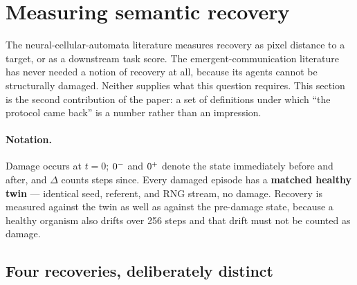 \section{Measuring semantic recovery}
\label{sec:protocol}

The neural-cellular-automata literature measures recovery as pixel distance to a
target, or as a downstream task score. The emergent-communication literature has
never needed a notion of recovery at all, because its agents cannot be
structurally damaged. Neither supplies what this question requires. This section
is the second contribution of the paper: a set of definitions under which
``the protocol came back'' is a number rather than an impression.

\paragraph{Notation.} Damage occurs at $t=0$; ${0^{-}}$ and ${0^{+}}$ denote the state
immediately before and after, and $\Delta$ counts steps since. Every damaged
episode has a \textbf{matched healthy twin} --- identical seed, referent, and RNG
stream, no damage. Recovery is measured against the twin as well as against the
pre-damage state, because a healthy organism also drifts over 256 steps and that
drift must not be counted as damage.

\subsection{Four recoveries, deliberately distinct}

